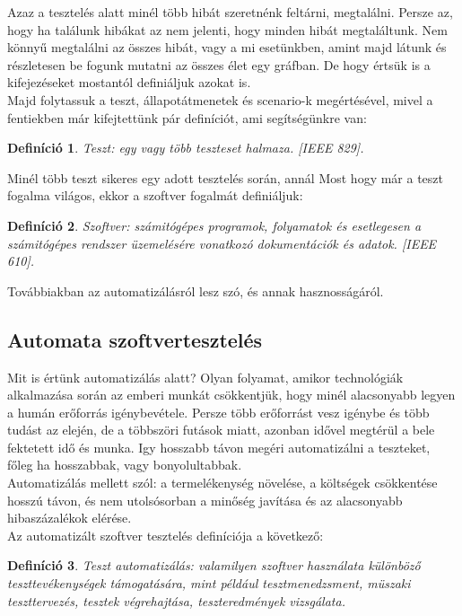 \documentclass[12pt]{article}
\newtheorem{defin}{Definíció}[section]
\begin{document}
Azaz a tesztelés alatt minél több hibát szeretnénk feltárni, megtalálni. Persze az, hogy ha találunk hibákat az nem jelenti, hogy minden hibát megtaláltunk. Nem könnyű megtalálni az összes hibát, vagy a mi esetünkben, amint majd látunk és részletesen be fogunk mutatni az összes élet egy gráfban. De hogy értsük is a kifejezéseket mostantól definiáljuk azokat is.\\

Majd folytassuk a teszt, állapotátmenetek és scenario-k megértésével, mivel a fentiekben már kifejtettünk pár definíciót, ami segítségünkre van:

\begin{defin}
Teszt: egy vagy több teszteset halmaza. [IEEE 829]. ~\cite{htb:masterfield}
\end{defin}

Minél több teszt sikeres egy adott tesztelés során, annál  
Most hogy már a teszt fogalma világos, ekkor a szoftver fogalmát definiáljuk:

\begin{defin}
Szoftver: számitógépes programok, folyamatok és esetlegesen a számitógépes rendszer üzemelésére vonatkozó dokumentációk és adatok. [IEEE 610]. ~\cite{htb:masterfield}
\end{defin}

Továbbiakban az automatizálásról lesz szó, és annak hasznosságáról.

\subsection{Automata szoftvertesztelés}

Mit is értünk automatizálás alatt?
Olyan folyamat, amikor technológiák alkalmazása során az emberi munkát csökkentjük, hogy minél alacsonyabb legyen a humán erőforrás igénybevétele. 
Persze több erőforrást vesz igénybe és több tudást az elején, de a többszöri futások miatt, azonban idővel megtérül a bele fektetett idő és munka. Igy hosszabb távon megéri automatizálni a teszteket, főleg ha hosszabbak, vagy bonyolultabbak.\\
Automatizálás mellett szól: a termelékenység növelése, a költségek csökkentése hosszú távon, és nem utolsósorban a minőség javítása és az alacsonyabb hibaszázalékok elérése.\\
Az automatizált szoftver tesztelés definíciója a következő:

\begin{defin}
Teszt automatizálás: valamilyen szoftver használata különböző teszttevékenységek támogatására, mint például tesztmenedzsment, müszaki teszttervezés, tesztek végrehajtása, teszteredmények vizsgálata. ~\cite{htb:masterfield}
\end{defin}
\end{document}
